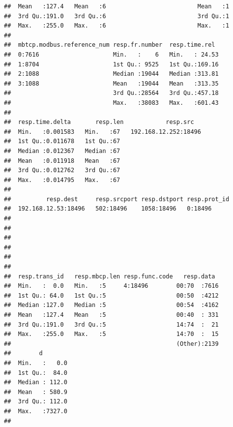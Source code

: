 \documentclass[]{article}
\begin{document}
\begin{verbatim}
##  Mean   :127.4   Mean   :6                          Mean   :1            
##  3rd Qu.:191.0   3rd Qu.:6                          3rd Qu.:1            
##  Max.   :255.0   Max.   :6                          Max.   :1            
##                                                                          
##  mbtcp.modbus.reference_num resp.fr.number  resp.time.rel   
##  0:7616                     Min.   :    6   Min.   : 24.53  
##  1:8704                     1st Qu.: 9525   1st Qu.:169.16  
##  2:1088                     Median :19044   Median :313.81  
##  3:1088                     Mean   :19044   Mean   :313.35  
##                             3rd Qu.:28564   3rd Qu.:457.18  
##                             Max.   :38083   Max.   :601.43  
##                                                             
##  resp.time.delta       resp.len            resp.src    
##  Min.   :0.001583   Min.   :67   192.168.12.252:18496  
##  1st Qu.:0.011678   1st Qu.:67                         
##  Median :0.012367   Median :67                         
##  Mean   :0.011918   Mean   :67                         
##  3rd Qu.:0.012762   3rd Qu.:67                         
##  Max.   :0.014795   Max.   :67                         
##                                                        
##          resp.dest     resp.srcport resp.dstport resp.prot_id
##  192.168.12.53:18496   502:18496    1058:18496   0:18496     
##                                                              
##                                                              
##                                                              
##                                                              
##                                                              
##                                                              
##  resp.trans_id   resp.mbcp.len resp.func.code   resp.data   
##  Min.   :  0.0   Min.   :5     4:18496        00:70  :7616  
##  1st Qu.: 64.0   1st Qu.:5                    00:50  :4212  
##  Median :127.0   Median :5                    00:54  :4162  
##  Mean   :127.4   Mean   :5                    00:40  : 331  
##  3rd Qu.:191.0   3rd Qu.:5                    14:74  :  21  
##  Max.   :255.0   Max.   :5                    14:70  :  15  
##                                               (Other):2139  
##        d         
##  Min.   :   0.0  
##  1st Qu.:  84.0  
##  Median : 112.0  
##  Mean   : 580.9  
##  3rd Qu.: 112.0  
##  Max.   :7327.0  
## 
\end{verbatim}
\end{document}
